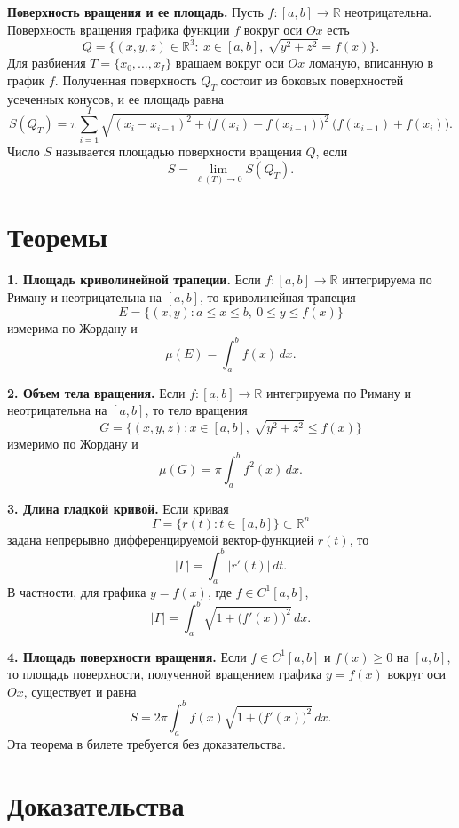 \documentclass[12pt,a4paper]{article}
\newcommand{\R}{\mathbb{R}}
\newcommand{\dd}{\,d}
\begin{document}
\textbf{Поверхность вращения и ее площадь.}
Пусть \(f\colon [a,b]\to\R\) неотрицательна. Поверхность вращения графика
функции \(f\) вокруг оси \(Ox\) есть
\[
  Q=
  \{(x,y,z)\in\R^3:\ x\in[a,b],\ \sqrt{y^2+z^2}=f(x)\}.
\]
Для разбиения \(T=\{x_0,\dots,x_I\}\) вращаем вокруг оси \(Ox\) ломаную,
вписанную в график \(f\). Полученная поверхность \(Q_T\) состоит из боковых
поверхностей усеченных конусов, и ее площадь равна
\[
  S(Q_T)=
  \pi\sum_{i=1}^I
  \sqrt{(x_i-x_{i-1})^2+\bigl(f(x_i)-f(x_{i-1})\bigr)^2}\,
  \bigl(f(x_{i-1})+f(x_i)\bigr).
\]
Число \(S\) называется площадью поверхности вращения \(Q\), если
\[
  S=\lim_{\ell(T)\to0} S(Q_T).
\]

\section*{Теоремы}

\textbf{1. Площадь криволинейной трапеции.}
Если \(f\colon [a,b]\to\R\) интегрируема по Риману и неотрицательна на
\([a,b]\), то криволинейная трапеция
\[
  E=\{(x,y):a\le x\le b,\ 0\le y\le f(x)\}
\]
измерима по Жордану и
\[
  \mu(E)=\int_a^b f(x)\dd x.
\]

\textbf{2. Объем тела вращения.}
Если \(f\colon [a,b]\to\R\) интегрируема по Риману и неотрицательна на
\([a,b]\), то тело вращения
\[
  G=\{(x,y,z):x\in[a,b],\ \sqrt{y^2+z^2}\le f(x)\}
\]
измеримо по Жордану и
\[
  \mu(G)=\pi\int_a^b f^2(x)\dd x.
\]

\textbf{3. Длина гладкой кривой.}
Если кривая
\[
  \Gamma=\{r(t):t\in[a,b]\}\subset\R^n
\]
задана непрерывно дифференцируемой вектор-функцией \(r(t)\), то
\[
  |\Gamma|=\int_a^b |r'(t)|\dd t.
\]
В частности, для графика \(y=f(x)\), где \(f\in C^1[a,b]\),
\[
  |\Gamma|=\int_a^b \sqrt{1+\bigl(f'(x)\bigr)^2}\dd x.
\]

\textbf{4. Площадь поверхности вращения.}
Если \(f\in C^1[a,b]\) и \(f(x)\ge0\) на \([a,b]\), то площадь поверхности,
полученной вращением графика \(y=f(x)\) вокруг оси \(Ox\), существует и равна
\[
  S=2\pi\int_a^b f(x)\sqrt{1+\bigl(f'(x)\bigr)^2}\dd x.
\]
Эта теорема в билете требуется без доказательства.

\section*{Доказательства}
\end{document}
